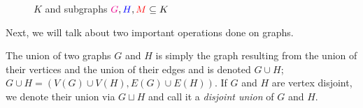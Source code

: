 \begin{figure}[H]
\begin{center}
    \end{center}
    \caption{$K$ and subgraphs $\textcolor{magenta}{G}, \textcolor{blue}{H}, \textcolor{red}{M} \subseteq K$}
    \label{fig:subgraphs}
    \end{figure}
Next, we will talk about two important operations done on graphs.

\begin{definition}
The union of two graphs $G$ and $H$ is simply the graph resulting from the union of their vertices and the union of their edges and is denoted $G\cup H$; $G\cup H=(V(G)\cup V(H),E(G)\cup E(H))$. If $G$ and $H$ are vertex disjoint, we denote their union via $G\sqcup H$ and call it a \textit{disjoint union} of $G$ and $H$.
\end{definition}

